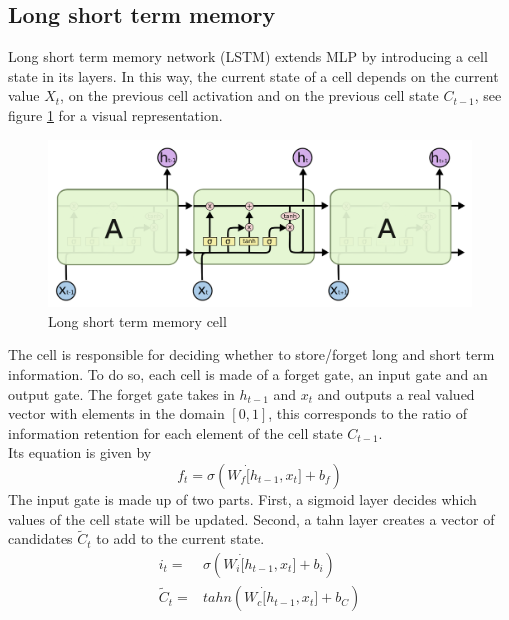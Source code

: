 \subsection{Long short term memory}

Long short term memory network (LSTM) extends MLP by introducing a cell state in its layers. In this way, the current state of a cell depends on the current value $X_t$, on the previous cell activation and on the previous cell state $C_{t-1}$, see figure \ref{fig:lstm_cell} for a visual representation. 
\begin{figure}[!h]
    \includegraphics[width=\textwidth]{images/lstm_cell.png}
    \caption{Long short term memory cell}
    \label{fig:lstm_cell}
\end{figure}
The cell is responsible for deciding whether to store/forget long and short term information. To do so, each cell is made of a forget gate, an input gate and an output gate.
The forget gate takes in $h_{t-1}$ and $x_t$ and outputs a real valued vector with elements in the domain $[0,1]$, this corresponds to the ratio of information retention for each element of the cell state $C_{t-1}$.
\\
Its equation is given by
\begin{equation}
    f_t=\sigma(W_f\dot[h_{t-1},x_t]+b_f)
\end{equation}
The input gate is made up of two parts. First, a sigmoid layer decides which values of the cell state will be updated. Second, a tahn layer creates a vector of candidates $\tilde{C}_t$ to add to the current state.
\begin{equation}
    \begin{aligned}
        i_t=&\sigma(W_i\dot[h_{t-1},x_t]+b_i)
        \\
        \tilde{C}_t=&tahn(W_c\dot[h_{t-1},x_t]+b_C)
    \end{aligned}
\end{equation}
